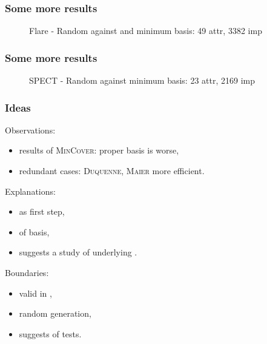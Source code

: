\begin{frame}
\frametitle{Some more results}

\vspace{-1.5em}

\begin{figure}
	\centering
\scalebox{0.5}{}

\caption{Flare - Random against and minimum basis: 49 attr, 3382 imp}
\label{fig:barplot-flare}
\end{figure}

\end{frame}

\begin{frame}
\frametitle{Some more results}

\vspace{-1.5em}

\begin{figure}
	\centering
	\scalebox{0.5}{}
	
	\caption{SPECT - Random against minimum basis: 23 attr, 2169 imp}
	\label{fig:barplot-spect}
\end{figure}

\end{frame}

\begin{frame}
\frametitle{Ideas}

Observations:
\begin{itemize}
	\item results of \textsc{MinCover}: proper basis is worse,
	\item redundant cases: \textsc{Duquenne}, \textsc{Maier} more efficient.
\end{itemize}

\vspace{0.5em}

Explanations:
\begin{itemize}
	\item {} as first step,
	\item {} of basis,
	\item suggests a study of underlying .
\end{itemize}

\vspace{0.5em}

Boundaries:
\begin{itemize}
	\item valid in ,
	\item random generation,
	\item suggests  of tests.
\end{itemize}

\end{frame}